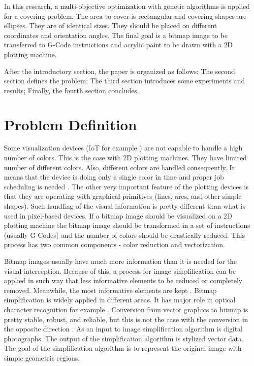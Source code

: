 \documentclass[conference]{IEEEtran}
\begin{document}
In this research, a multi-objective optimization with genetic algorithms is applied for a covering problem. The area to cover is rectangular and covering shapes are ellipses. They are of identical sizes. They should be placed on different coordinates and orientation angles. The final goal is a bitmap image to be transferred to G-Code instructions and acrylic paint to be drawn with a 2D plotting machine. 

After the introductory section, the paper is organized as follows: The second section defines the problem; The third section introduces some experiments and results; Finally, the fourth section concludes. 

\section{Problem Definition}

Some visualization devices (IoT for example \cite{Dineva-Atanasova-2019}) are not capable to handle a high number of colors. This is the case with 2D plotting machines. They have limited number of different colors. Also, different colors are handled consequently. It means that the device is doing only a single color in time and proper job scheduling is needed \cite{Borissova-Mustakerov-2015}. The other very important feature of the plotting devices is that they are operating with graphical primitives (lines, arcs, and other simple shapes). Such handling of the visual information is pretty different than what is used in pixel-based devices. If a bitmap image should be visualized on a 2D plotting machine the bitmap image should be transformed in a set of instructions (usually G-Codes) and the number of colors should be drastically reduced. This process has two common components -  color reduction and vectorization.

Bitmap images usually have much more information than it is needed for the visual interception. Because of this, a process for image simplification can be applied in such way that less informative elements to be reduced or completely removed. Meanwhile, the most informative elements are kept \cite{Ferreira-Fonseca-Jorge-Ramalho-2004}. Bitmap simplification is widely applied in different areas. It has major role in optical character recognition for example \cite{Wenyin-Dori-1999}. Conversion from vector graphics to bitmap is pretty stable, robust, and reliable, but this is not the case with the conversion in the opposite direction \cite{Tombre-Ah-Soon-Dosch-Masini-Tabbone-1999}. As an input to image simplification algorithm is digital photographs. The output of the simplification algorithm is stylized vector data. The goal of the simplification algorithm is to represent the original image with simple geometric regions.
\end{document}
